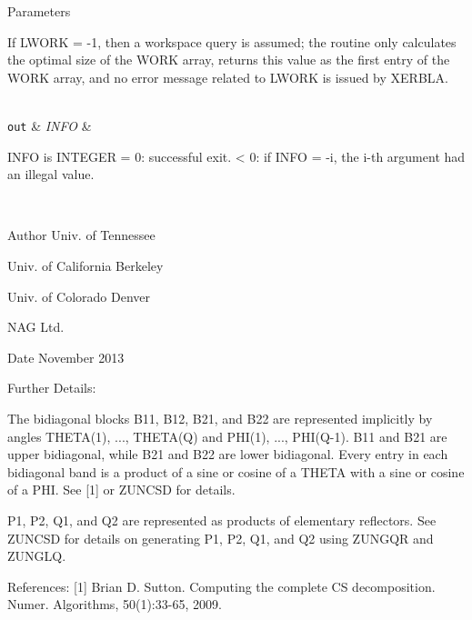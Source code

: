 \begin{DoxyParams}[1]{Parameters}
\begin{DoxyVerb}
          If LWORK = -1, then a workspace query is assumed; the routine
          only calculates the optimal size of the WORK array, returns
          this value as the first entry of the WORK array, and no error
          message related to LWORK is issued by XERBLA.\end{DoxyVerb}
\\
\hline
\mbox{\tt out}  & {\em I\+N\+F\+O} & \begin{DoxyVerb}          INFO is INTEGER
          = 0:  successful exit.
          < 0:  if INFO = -i, the i-th argument had an illegal value.\end{DoxyVerb}
 \\
\hline
\end{DoxyParams}
\begin{DoxyAuthor}{Author}
Univ. of Tennessee 

Univ. of California Berkeley 

Univ. of Colorado Denver 

N\+A\+G Ltd. 
\end{DoxyAuthor}
\begin{DoxyDate}{Date}
November 2013 
\end{DoxyDate}
\begin{DoxyParagraph}{Further Details\+: }
\begin{DoxyVerb}  The bidiagonal blocks B11, B12, B21, and B22 are represented
  implicitly by angles THETA(1), ..., THETA(Q) and PHI(1), ...,
  PHI(Q-1). B11 and B21 are upper bidiagonal, while B21 and B22 are
  lower bidiagonal. Every entry in each bidiagonal band is a product
  of a sine or cosine of a THETA with a sine or cosine of a PHI. See
  [1] or ZUNCSD for details.

  P1, P2, Q1, and Q2 are represented as products of elementary
  reflectors. See ZUNCSD for details on generating P1, P2, Q1, and Q2
  using ZUNGQR and ZUNGLQ.\end{DoxyVerb}
 
\end{DoxyParagraph}
\begin{DoxyParagraph}{References\+: }
\mbox{[}1\mbox{]} Brian D. Sutton. Computing the complete C\+S decomposition. Numer. Algorithms, 50(1)\+:33-\/65, 2009. 
\end{DoxyParagraph}
